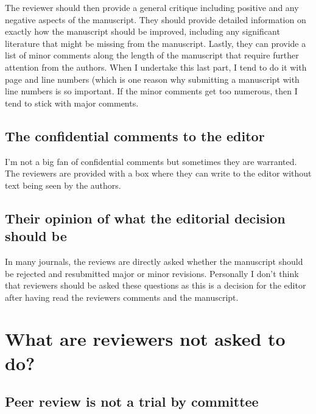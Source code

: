 \documentclass[
]{krantz}
\begin{document}
The reviewer should then provide a general critique including positive and any negative aspects of the manuscript. They should provide detailed information on exactly how the manuscript should be improved, including any significant literature that might be missing from the manuscript. Lastly, they can provide a list of minor comments along the length of the manuscript that require further attention from the authors. When I undertake this last part, I tend to do it with page and line numbers (which is one reason why submitting a manuscript with line numbers is so important. If the minor comments get too numerous, then I tend to stick with major comments.

\hypertarget{the-confidential-comments-to-the-editor}{%
\subsection{The confidential comments to the editor}\label{the-confidential-comments-to-the-editor}}

I'm not a big fan of confidential comments but sometimes they are warranted. The reviewers are provided with a box where they can write to the editor without text being seen by the authors.

\hypertarget{their-opinion-of-what-the-editorial-decision-should-be}{%
\subsection{Their opinion of what the editorial decision should be}\label{their-opinion-of-what-the-editorial-decision-should-be}}

In many journals, the reviews are directly asked whether the manuscript should be rejected and resubmitted major or minor revisions. Personally I don't think that reviewers should be asked these questions as this is a decision for the editor after having read the reviewers comments and the manuscript.

\hypertarget{what-are-reviewers-not-asked-to-do}{%
\section{What are reviewers not asked to do?}\label{what-are-reviewers-not-asked-to-do}}

\hypertarget{peer-review-is-not-a-trial-by-committee}{%
\subsection{Peer review is not a trial by committee}\label{peer-review-is-not-a-trial-by-committee}}
\end{document}
